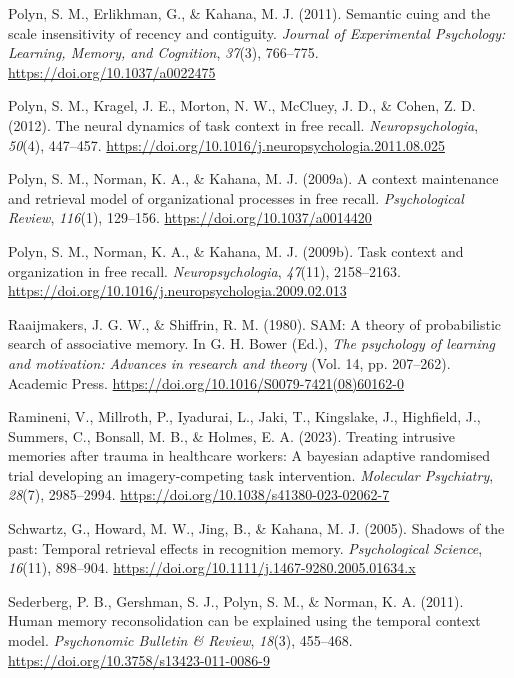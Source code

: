 \documentclass[
  man,
  floatsintext,
  longtable,
  nolmodern,
  notxfonts,
  notimes,
  draftfirst,
  colorlinks=true,linkcolor=blue,citecolor=blue,urlcolor=blue]{apa7}
\newlength{\cslhangindent}
\newenvironment{CSLReferences}[2] %
 {\begin{list}{}{%
  \setlength{\itemindent}{0pt}
  \setlength{\leftmargin}{0pt}
  \setlength{\parsep}{0pt}
  \ifodd #1
   \setlength{\leftmargin}{\cslhangindent}
   \setlength{\itemindent}{-1\cslhangindent}
  \fi
  \setlength{\itemsep}{#2\baselineskip}}}
 {\end{list}}
\begin{document}
\begin{CSLReferences}{1}{0}
Polyn, S. M., Erlikhman, G., \& Kahana, M. J. (2011). Semantic cuing and
the scale insensitivity of recency and contiguity. \emph{Journal of
Experimental Psychology: Learning, Memory, and Cognition}, \emph{37}(3),
766--775. \url{https://doi.org/10.1037/a0022475}

Polyn, S. M., Kragel, J. E., Morton, N. W., McCluey, J. D., \& Cohen, Z.
D. (2012). The neural dynamics of task context in free recall.
\emph{Neuropsychologia}, \emph{50}(4), 447--457.
\url{https://doi.org/10.1016/j.neuropsychologia.2011.08.025}

Polyn, S. M., Norman, K. A., \& Kahana, M. J. (2009a). A context
maintenance and retrieval model of organizational processes in free
recall. \emph{Psychological Review}, \emph{116}(1), 129--156.
\url{https://doi.org/10.1037/a0014420}

Polyn, S. M., Norman, K. A., \& Kahana, M. J. (2009b). Task context and
organization in free recall. \emph{Neuropsychologia}, \emph{47}(11),
2158--2163. \url{https://doi.org/10.1016/j.neuropsychologia.2009.02.013}

Raaijmakers, J. G. W., \& Shiffrin, R. M. (1980). {SAM}: A theory of
probabilistic search of associative memory. In G. H. Bower (Ed.),
\emph{The psychology of learning and motivation: Advances in research
and theory} (Vol. 14, pp. 207--262). Academic Press.
\url{https://doi.org/10.1016/S0079-7421(08)60162-0}

Ramineni, V., Millroth, P., Iyadurai, L., Jaki, T., Kingslake, J.,
Highfield, J., Summers, C., Bonsall, M. B., \& Holmes, E. A. (2023).
Treating intrusive memories after trauma in healthcare workers: A
bayesian adaptive randomised trial developing an imagery-competing task
intervention. \emph{Molecular Psychiatry}, \emph{28}(7), 2985--2994.
\url{https://doi.org/10.1038/s41380-023-02062-7}

Schwartz, G., Howard, M. W., Jing, B., \& Kahana, M. J. (2005). Shadows
of the past: Temporal retrieval effects in recognition memory.
\emph{Psychological Science}, \emph{16}(11), 898--904.
\url{https://doi.org/10.1111/j.1467-9280.2005.01634.x}

Sederberg, P. B., Gershman, S. J., Polyn, S. M., \& Norman, K. A.
(2011). Human memory reconsolidation can be explained using the temporal
context model. \emph{Psychonomic Bulletin \& Review}, \emph{18}(3),
455--468. \url{https://doi.org/10.3758/s13423-011-0086-9}


\end{CSLReferences}
\end{document}
